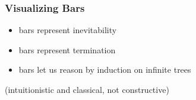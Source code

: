 \documentclass[10pt]{beamer}
\begin{document}
\begin{frame}
  \frametitle{Visualizing Bars}
\end{frame}

\begin{frame}
  \begin{itemize}
    \item bars represent inevitability
      \pause
    \item bars represent termination
      \pause
    \item \alert{bars let us reason by induction on infinite trees}
  \end{itemize}
  \pause
  \begin{center}
    (intuitionistic and classical, not constructive)
  \end{center}
\end{frame}
\end{document}
